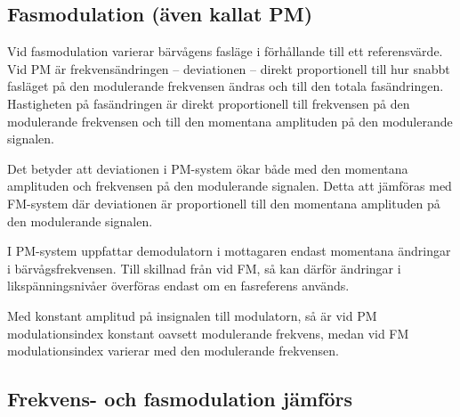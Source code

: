 \subsection{Fasmodulation (även kallat PM)}

Vid fasmodulation varierar bärvågens fasläge i förhållande till ett
referensvärde. Vid PM är frekvensändringen -- deviationen -- direkt proportionell
till hur snabbt fasläget på den modulerande frekvensen ändras och till den
totala fasändringen. Hastigheten på fasändringen är direkt proportionell till
frekvensen på den modulerande frekvensen och till den momentana amplituden på
den modulerande signalen.

Det betyder att deviationen i PM-system ökar både med den momentana amplituden
och frekvensen på den modulerande signalen. Detta att jämföras med FM-system där
deviationen är proportionell till den momentana amplituden på den modulerande
signalen.

I PM-system uppfattar demodulatorn i mottagaren endast momentana ändringar i
bärvågsfrekvensen. Till skillnad från vid FM, så kan därför ändringar i
likspänningsnivåer överföras endast om en fasreferens används.

Med konstant amplitud på insignalen till modulatorn, så är vid PM
modulationsindex konstant oavsett modulerande frekvens, medan vid FM
modulationsindex varierar med den modulerande frekvensen.

\subsection{Frekvens- och fasmodulation jämförs}

